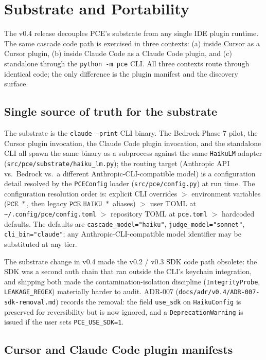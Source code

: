 \section{Substrate and Portability}\label{sec:substrate}

The v0.4 release decouples PCE's substrate from any single IDE plugin runtime. The same cascade code path is exercised in three contexts: (a) inside Cursor as a Cursor plugin, (b) inside Claude Code as a Claude Code plugin, and (c) standalone through the \texttt{python -m pce} CLI. All three contexts route through identical code; the only difference is the plugin manifest and the discovery surface.

\subsection{Single source of truth for the substrate}

The substrate is the \texttt{claude --print} CLI binary. The Bedrock Phase 7 pilot, the Cursor plugin invocation, the Claude Code plugin invocation, and the standalone CLI all spawn the same binary as a subprocess against the same \texttt{HaikuLM} adapter (\texttt{src/pce/substrate/haiku\_lm.py}); the routing target (Anthropic API vs.\ Bedrock vs.\ a different Anthropic-CLI-compatible model) is a configuration detail resolved by the \texttt{PCEConfig} loader (\texttt{src/pce/config.py}) at run time. The configuration resolution order is: explicit CLI overrides $>$ environment variables ($\mathtt{PCE\_*}$, then legacy $\mathtt{PCE\_HAIKU\_*}$ aliases) $>$ user TOML at \texttt{\textasciitilde/.config/pce/config.toml} $>$ repository TOML at \texttt{pce.toml} $>$ hardcoded defaults. The defaults are \texttt{cascade\_model="haiku"}, \texttt{judge\_model="sonnet"}, \texttt{cli\_bin="claude"}; any Anthropic-CLI-compatible model identifier may be substituted at any tier.

The substrate change in v0.4 made the v0.2 / v0.3 SDK code path obsolete: the SDK was a second auth chain that ran outside the CLI's keychain integration, and shipping both made the contamination-isolation discipline (\texttt{IntegrityProbe}, \texttt{LEAKAGE\_REGEX}) materially harder to audit. ADR-007 (\texttt{docs/adr/v0.4/ADR-007-sdk-removal.md}) records the removal: the field \texttt{use\_sdk} on \texttt{HaikuConfig} is preserved for reversibility but is now ignored, and a \texttt{DeprecationWarning} is issued if the user sets \texttt{PCE\_USE\_SDK=1}.

\subsection{Cursor and Claude Code plugin manifests}

